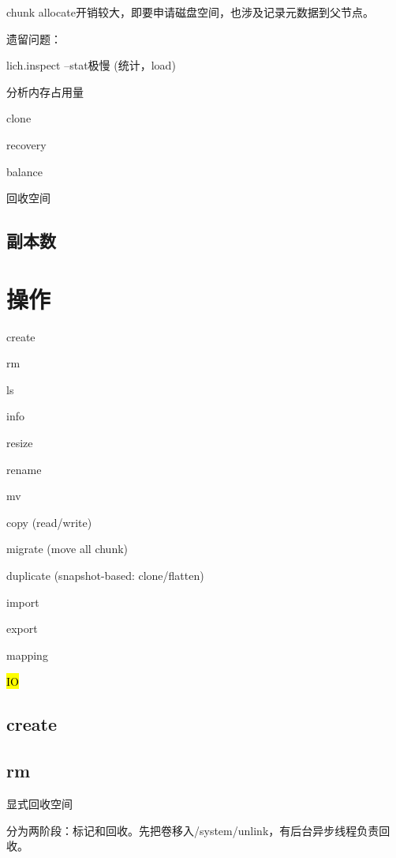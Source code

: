 chunk allocate开销较大，即要申请磁盘空间，也涉及记录元数据到父节点。

遗留问题：
\begin{enumbox}
\item lich.inspect --stat极慢 (统计，load)
\item 分析内存占用量
\item clone
\item recovery
\item balance
\item 回收空间
\end{enumbox}

\subsection{副本数}

\section{操作}

\begin{enumbox}
\item create
\item rm
\item ls
\item info
\item resize
\item rename
\item mv
\item copy (read/write)
\item migrate (move all chunk)
\item duplicate (snapshot-based: clone/flatten)
\item import
\item export
\item mapping
\item \hl{IO}
\end{enumbox}

\subsection{create}

\subsection{rm}

显式回收空间

分为两阶段：标记和回收。先把卷移入/system/unlink，有后台异步线程负责回收。

